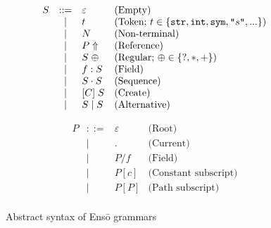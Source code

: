 \documentclass[a4paper]{article}
\def\enso{Ens\={o}\xspace}
\begin{document}
\begin{figure}
\begin{minipage}[t]{0.5\textwidth}
\[
\begin{array}{rcll}
S & ::= & \varepsilon & \text{(Empty)} \\
  & \mid & t & \text{(Token; } t\in\{\text{\texttt{str}}, \text{\texttt{int}}, \text{\texttt{sym}}, \text{\texttt{"}}s\text{\texttt{"}},... \}\text{)} \\
  & \mid & N & \text{(Non-terminal)}\\
  & \mid & P\Uparrow & \text{(Reference)}\\
  & \mid & S\;\oplus & \text{(Regular; }\oplus\in\{?,*,+\}\text{)}\\ 
  & \mid & f:S & \text{(Field)}\\
  & \mid & S\cdot S & \text{(Sequence)}\\
  & \mid & [C]\; S & \text{(Create)}\\
  & \mid & S \mid S & \text{(Alternative)}\\
\end{array}
\]
\end{minipage}
\begin{minipage}[t]{0.5\textwidth}
\[
\begin{array}{rcll}
P & ::= & \varepsilon & \text{(Root)}\\
  & \mid & . & \text{(Current)}\\
  & \mid & P / f & \text{(Field)}\\
  & \mid & P [c] & \text{(Constant subscript)}\\
  & \mid & P [P] & \text{(Path subscript)}\\
\end{array}
\]
\end{minipage}
\caption{Abstract syntax of \enso grammars\label{FIG:metasyntax}}
\end{figure}
\end{document}
